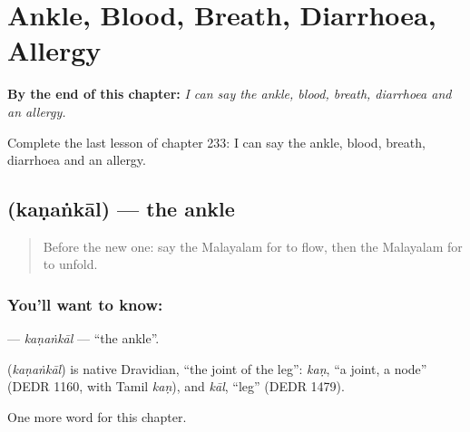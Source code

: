 
\chapter{Ankle, Blood, Breath, Diarrhoea, Allergy}
\label{ch:ml-ankle-blood-breath-diarrhoea-allergy}

\begin{chapteropening}
\textbf{By the end of this chapter:} \emph{I can say the ankle, blood, breath, diarrhoea and an allergy.}

Complete the last lesson of chapter 233: I can say the ankle, blood, breath, diarrhoea and an allergy.
\end{chapteropening}

\section[\texorpdfstring{\ml{കണങ്കാൽ} (kaṇaṅkāl)}{കണങ്കാൽ (kaṇaṅkāl)}]{ (kaṇaṅkāl) — the ankle}

\label{lesson:ML-C233-kanankal}



\begin{quote}
Before the new one: say the Malayalam for to flow, then the Malayalam for to unfold.
\end{quote}

\subsection*{You'll want to know: }
\textbf{} — \emph{kaṇaṅkāl} — \textquotedblleft{}the ankle\textquotedblright{}.

\begin{cousinweb}
\textbf{} (\emph{kaṇaṅkāl}) is native Dravidian, \textquotedblleft{}the joint of the leg\textquotedblright{}: \emph{kaṇ}, \textquotedblleft{}a joint, a node\textquotedblright{} (DEDR 1160, with Tamil \emph{kaṇ}), and \emph{kāl}, \textquotedblleft{}leg\textquotedblright{} (DEDR 1479).
\end{cousinweb}

\begin{grammarlens}[title={What you've built}]
One more word for this chapter.
\end{grammarlens}

